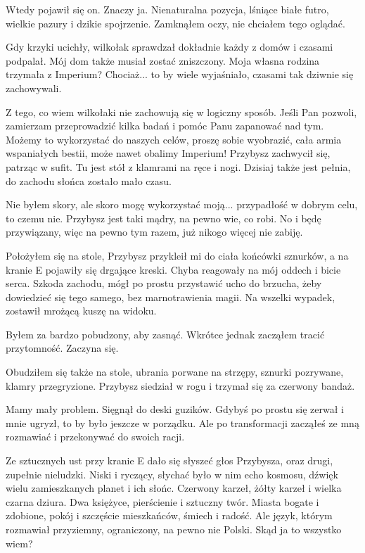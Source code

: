 Wtedy pojawił się on. Znaczy ja.
Nienaturalna pozycja, lśniące białe futro, wielkie pazury i dzikie spojrzenie.
Zamknąłem oczy, nie chciałem tego oglądać.

Gdy krzyki ucichły, wilkołak sprawdzał dokładnie każdy z domów i czasami podpalał.
Mój dom także musiał zostać zniszczony. Moja własna rodzina trzymała z Imperium? 
Chociaż... to by wiele wyjaśniało, czasami tak dziwnie się zachowywali.

\ds{} Z tego, co wiem wilkołaki nie zachowują się w logiczny sposób.
Jeśli Pan pozwoli, zamierzam przeprowadzić kilka badań i pomóc Panu zapanować nad tym.
Możemy to wykorzystać do naszych celów, proszę sobie wyobrazić, cała armia wspaniałych bestii, może nawet obalimy Imperium!
\dm{} Przybysz zachwycił się, patrząc w sufit.
\dm{} Tu jest stół z klamrami na ręce i nogi.
Dzisiaj także jest pełnia, do zachodu słońca zostało mało czasu.\de{}

Nie byłem skory, ale skoro mogę wykorzystać moją... przypadłość w dobrym celu, to czemu nie.
Przybysz jest taki mądry, na pewno wie, co robi.
No i będę przywiązany, więc na pewno tym razem, już nikogo więcej nie zabiję.

Położyłem się na stole, Przybysz przykleił mi do ciała końcówki sznurków, a na kranie E pojawiły się drgające kreski.
Chyba reagowały na mój oddech i bicie serca. Szkoda zachodu, mógł po prostu przystawić ucho do brzucha, żeby dowiedzieć się tego samego, bez marnotrawienia magii.
Na wszelki wypadek, zostawił mrożącą kuszę na widoku.

Byłem za bardzo pobudzony, aby zasnąć. Wkrótce jednak zacząłem tracić przytomność. Zaczyna się.

\divider{}
Obudziłem się także na stole, ubrania porwane na strzępy, sznurki pozrywane, klamry przegryzione.
Przybysz siedział w rogu i trzymał się za czerwony bandaż.

\ds{} Mamy mały problem.
\dm{} Sięgnął do deski guzików.
\dm{} Gdybyś po prostu się zerwał i mnie ugryzł, to by było jeszcze w porządku.
Ale po transformacji zacząłeś ze mną rozmawiać i przekonywać do swoich racji. \de{}

Ze sztucznych ust przy kranie E dało się słyszeć głos Przybysza, oraz drugi, zupełnie nieludzki.
Niski i ryczący, słychać było w nim echo kosmosu, dźwięk wielu zamieszkanych planet i ich słońc.
Czerwony karzeł, żółty karzeł i wielka czarna dziura. 
Dwa księżyce, pierścienie i sztuczny twór.
Miasta bogate i zdobione, pokój i szczęście mieszkańców, śmiech i radość.
Ale język, którym rozmawiał przyziemny, ograniczony, na pewno nie Polski.
Skąd ja to wszystko wiem?

